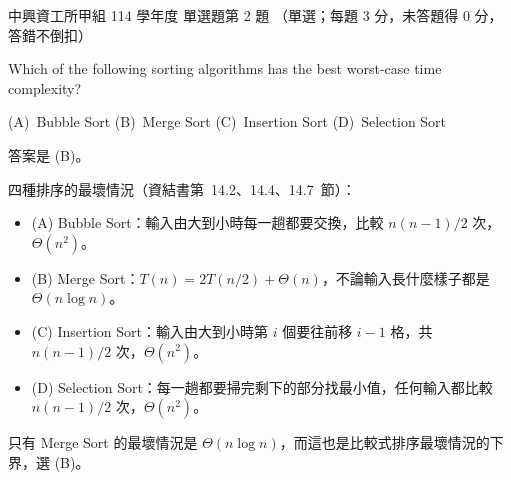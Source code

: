 \begin{pastexam}[label={px:nchu-114-dsa-02}]{中興資工所甲組 114 學年度 單選題第 2 題}
（單選；每題 3 分，未答題得 0 分，答錯不倒扣）

Which of the following sorting algorithms has the best worst-case time complexity?

(A)~Bubble Sort \qquad (B)~Merge Sort \qquad (C)~Insertion Sort \qquad (D)~Selection Sort
\end{pastexam}

\begin{pastsoln}
答案是 (B)。

四種排序的最壞情況（資結書第~14.2、14.4、14.7~節）：
\begin{itemize}
\item (A) Bubble Sort：輸入由大到小時每一趟都要交換，比較 $n(n-1)/2$ 次，$\Theta(n^2)$。
\item (B) Merge Sort：$T(n) = 2T(n/2) + \Theta(n)$，不論輸入長什麼樣子都是 $\Theta(n \log n)$。
\item (C) Insertion Sort：輸入由大到小時第 $i$ 個要往前移 $i - 1$ 格，共 $n(n-1)/2$ 次，$\Theta(n^2)$。
\item (D) Selection Sort：每一趟都要掃完剩下的部分找最小值，任何輸入都比較 $n(n-1)/2$ 次，$\Theta(n^2)$。
\end{itemize}
只有 Merge Sort 的最壞情況是 $\Theta(n \log n)$，而這也是比較式排序最壞情況的下界，選 (B)。
\end{pastsoln}
